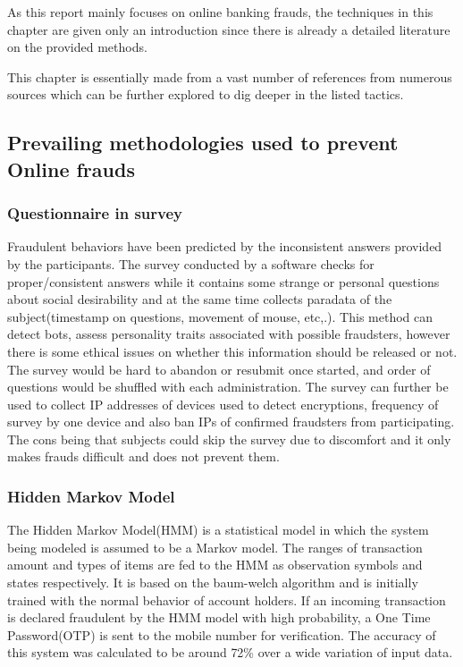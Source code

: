 \documentclass[12pt, oneside, a4paper]{article}
\begin{document}
As this report mainly focuses on online banking frauds, the techniques in this chapter are given only an introduction since there is already a detailed literature on the provided methods.

This chapter is essentially made from a vast number of references from numerous sources which can be further explored to dig deeper in the listed tactics.
\pagebreak

\subsection{Prevailing methodologies used to prevent Online frauds}
\vspace{0.5cm}
\subsubsection{Questionnaire in survey}
Fraudulent behaviors have been predicted by the inconsistent answers provided by the participants\cite{PrevailingMethods1}. The survey conducted by a software checks for proper/consistent answers while it contains some strange or personal questions about social desirability and at the same time collects paradata of the subject(timestamp on questions, movement of mouse, etc,.). This method can detect bots, assess personality traits associated with possible fraudsters, however there is some ethical issues on whether this information should be released or not. The survey would be hard to abandon or resubmit once started, and order of questions would be shuffled with each administration. The survey can further be used to collect IP addresses of devices used to detect encryptions, frequency of survey by one device and also ban IPs of confirmed fraudsters from participating. The cons being that subjects could skip the survey due to discomfort and it only makes frauds difficult and does not prevent them.

\subsubsection{Hidden Markov Model}
The Hidden Markov Model(HMM) is a statistical model in which the system being modeled is assumed to be a Markov model\cite{PrevailingMethods2}. The ranges of transaction amount and types of items are fed to the HMM as observation symbols and states respectively. It is based on the baum-welch algorithm and is initially trained with the normal behavior of account holders. If an incoming transaction is declared fraudulent by the HMM model with high probability, a One Time Password(OTP) is sent to the mobile number for verification. The accuracy of this system was calculated to be around 72\% over a wide variation of input data.
\end{document}
